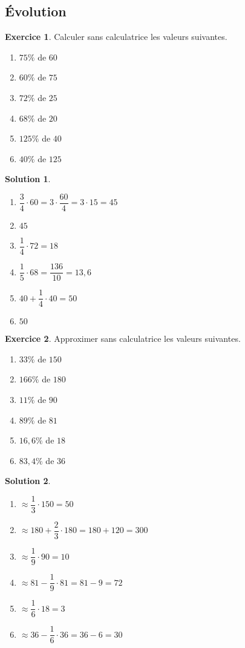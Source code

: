 \documentclass[a4paper, 14pt]{extarticle}
\theoremstyle{plain}
\newtheorem*{sol}{Solution}
\theoremstyle{definition}
\newtheorem{ex}{Exercice}
\newcommand{\exe}[2]{
		\begin{ex} #1  \end{ex}
		\begin{sol} #2 \end{sol}
	}
\newcommand{\exe}[2]{
		\begin{ex} #1  \end{ex}
	}
\begin{document}
\subsection*{Évolution}

\exe{
  Calculer sans calculatrice les valeurs suivantes.
  \begin{multicols}{2}
    \begin{enumerate}
    \item $75\%$ de $60$
    \item $60\%$ de $75$
    \item $72\%$ de $25$
    \item $68\%$ de $20$
    \item $125\%$ de $40$
    \item $40\%$ de $125$
    \end{enumerate}
  \end{multicols}
}{
  \begin{multicols}{2}
    \begin{enumerate}
    \item $\dfrac34 \cdot 60 = 3 \cdot \dfrac{60}4 = 3 \cdot 15 = 45$
    \item $45$
    \item $\dfrac14 \cdot 72 = 18$
    \item $\dfrac15 \cdot 68 = \dfrac{136}{10} = 13,6$
    \item $40 + \dfrac14 \cdot 40 = 50$
    \item $50$
    \end{enumerate}
  \end{multicols}
}

\exe{
  Approximer sans calculatrice les valeurs suivantes.
  \begin{multicols}{2}
    \begin{enumerate}
    \item $33\%$ de $150$
    \item $166\%$ de $180$
    \item $11\%$ de $90$
    \item $89\%$ de $81$
    \item $16,6\%$ de $18$
    \item $83,4\%$ de $36$
    \end{enumerate}
  \end{multicols}
}{
  \begin{multicols}{2}
    \begin{enumerate}
    \item $\approx \dfrac13 \cdot 150 = 50$
    \item $\approx 180 + \dfrac23 \cdot 180 = 180 + 120 = 300$
    \item $\approx \dfrac19 \cdot 90 = 10$
    \item $\approx 81 - \dfrac19 \cdot 81 = 81 - 9 = 72$
    \item $\approx \dfrac16 \cdot 18 = 3$
    \item $\approx 36 - \dfrac16 \cdot 36 = 36 - 6 = 30$
    \end{enumerate}
  \end{multicols}
}
\end{document}
